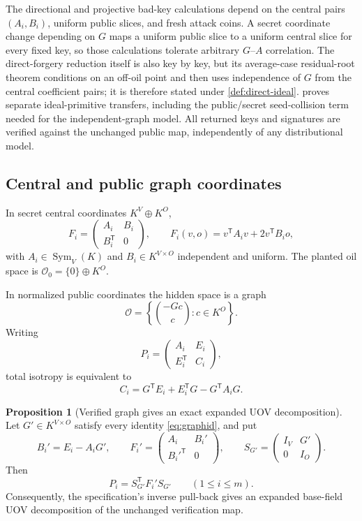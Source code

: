 \documentclass[11pt,a4paper]{article}
\theoremstyle{definition}
\newtheorem{proposition}[theorem]{Proposition}
\theoremstyle{remark}
\newcommand{\cO}{\mathcal O}
\newcommand{\Sym}{\operatorname{Sym}}
\newcommand{\trans}{\mathsf T}
\begin{document}
The directional and projective bad-key calculations depend on the central pairs $(A_i,B_i)$, uniform public slices, and fresh attack coins.  A secret coordinate change depending on $G$ maps a uniform public slice to a uniform central slice for every fixed key, so those calculations tolerate arbitrary $G$--$A$ correlation.  The direct-forgery reduction itself is also key by key, but its average-case residual-root theorem conditions on an off-oil point and then uses independence of $G$ from the central coefficient pairs; it is therefore stated under \cref{def:direct-ideal}.   proves separate ideal-primitive transfers, including the public/secret seed-collision term needed for the independent-graph model.  All returned keys and signatures are verified against the unchanged public map, independently of any distributional model.

\subsection{Central and public graph coordinates}

In secret central coordinates $K^V\oplus K^O$,
\begin{equation}\label{eq:central}
F_i=\begin{pmatrix}A_i&B_i\\B_i^{\trans}&0\end{pmatrix},
\qquad F_i(v,o)=v^{\trans}A_iv+2v^{\trans}B_io,
\end{equation}
with $A_i\in\Sym_V(K)$ and $B_i\in K^{V\times O}$ independent and uniform.  The planted oil space is $\cO_0=\{0\}\oplus K^O$.

In normalized public coordinates the hidden space is a graph
\begin{equation}\label{eq:graph}
\cO=\left\{\binom{-Gc}{c}:c\in K^O\right\}.
\end{equation}
Writing
\[
P_i=\begin{pmatrix}A_i&E_i\\E_i^{\trans}&C_i\end{pmatrix},
\]
total isotropy is equivalent to
\begin{equation}\label{eq:graphid}
C_i=G^{\trans}E_i+E_i^{\trans}G-G^{\trans}A_iG.
\end{equation}

\begin{proposition}[Verified graph gives an exact expanded UOV decomposition]\label{prop:verified-key}
Let $G'\in K^{V\times O}$ satisfy every identity \eqref{eq:graphid}, and put
\[
B_i'=E_i-A_iG',\qquad
F_i'=\begin{pmatrix}A_i&B_i'\\ {B_i'}^{\trans}&0\end{pmatrix},\qquad
S_{G'}=\begin{pmatrix}I_V&G'\\0&I_O\end{pmatrix}.
\]
Then
\[
P_i=S_{G'}^{\trans}F_i'S_{G'}
\qquad(1\le i\le m).
\]
Consequently, the specification's inverse pull-back gives an expanded base-field UOV decomposition of the unchanged verification map.
\end{proposition}
\end{document}
